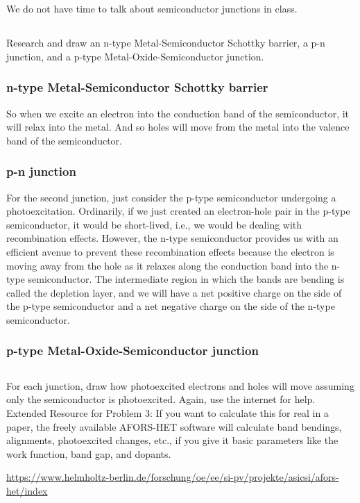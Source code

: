 \documentclass[12pt]{article}
\begin{document}
\section{}

We do not have time to talk about semiconductor junctions in class.
\subsection{}
Research and draw an n-type Metal-Semiconductor Schottky barrier, a p-n junction, and a p-type Metal-Oxide-Semiconductor junction. 
\subsubsection{n-type Metal-Semiconductor Schottky barrier}
So when we excite an electron into the conduction band of the semiconductor, it will relax into the metal. And so holes will move from the metal into the valence band of the semiconductor.
\subsubsection{p-n junction}
For the second junction, just consider the p-type semiconductor undergoing a photoexcitation. Ordinarily, if we just created an electron-hole pair in the p-type semiconductor, it would be short-lived, i.e., we would be dealing with recombination effects. However, the n-type semiconductor provides us with an efficient avenue to prevent these recombination effects because the electron is moving away from the hole as it relaxes along the conduction band into the n-type semiconductor. The intermediate region in which the bands are bending is called the depletion layer, and we will have a net positive charge on the side of the p-type semiconductor and a net negative charge on the side of the n-type semiconductor.
\subsubsection{p-type Metal-Oxide-Semiconductor junction}
\subsection{}
For each junction, draw how photoexcited electrons and holes will move assuming only the semiconductor is photoexcited. Again, use the internet for help.\\



Extended Resource for Problem 3: If you want to calculate this for real in a paper, the freely available AFORS-HET software will calculate band bendings, alignments, photoexcited changes, etc., if you give it basic parameters like the work function, band gap, and dopants.

\href{https://www.helmholtz-berlin.de/forschung/oe/ee/si-pv/projekte/asicsi/afors-het/index}{https://www.helmholtz-berlin.de/forschung/oe/ee/si-pv/projekte/asicsi/afors-het/index}
\end{document}
